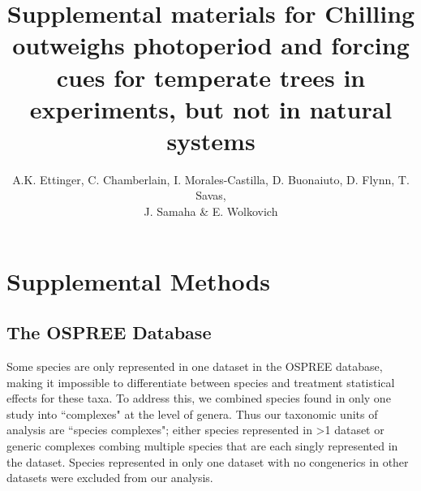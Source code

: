 \documentclass{article}
\begin{document}

\title{Supplemental materials  for Chilling outweighs photoperiod and forcing cues for temperate trees in experiments, but not in natural systems} %

\author{A.K. Ettinger, C. Chamberlain, I. Morales-Castilla, D. Buonaiuto, D. Flynn, T. Savas, \\J. Samaha \& E. Wolkovich}
\maketitle  %
\renewcommand{\thetable}{S\arabic{table}}
\renewcommand{\thefigure}{S\arabic{figure}}

\section*{Supplemental Methods}

\subsection*{The OSPREE Database}

\par Some species are only represented in one dataset in the OSPREE database, making it impossible to differentiate between species and treatment statistical effects for these taxa. To address this, we combined species found in only one study into ``complexes" at the level of genera. Thus our taxonomic units of analysis are ``species complexes"; either species represented in >1 dataset or generic complexes combing multiple species that are each singly represented in the dataset. Species represented in only one dataset with no congenerics in other datasets were excluded from our analysis.
\end{document}
